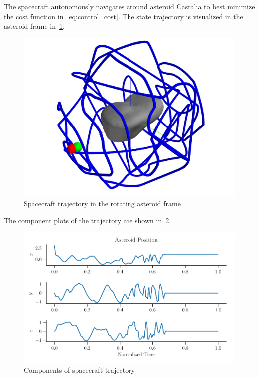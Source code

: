 The spacecraft autonomously navigates around asteroid Castalia to best minimize the cost function in~\cref{eq:control_cost}.
The state trajectory is visualized in the asteroid frame in~\cref{fig:castalia_explore_trajectory}.
\begin{figure}[htbp]
    \centering
    \includegraphics[width=\textwidth]{figures/computational_geometry/dynamic_exploration/castalia/state/asteroid_trajectory.jpg}
    \caption{Spacecraft trajectory in the rotating asteroid frame~\label{fig:castalia_explore_trajectory}}
\end{figure}
The component plots of the trajectory are shown in~\cref{fig:castalia_explore_components}.
\begin{figure}[htbp]
    \centering
    \includegraphics[width=\textwidth]{figures/computational_geometry/dynamic_exploration/52760/state/ast_comp.pdf}
    \caption{Components of spacecraft trajectory\label{fig:castalia_explore_components}}
\end{figure}

